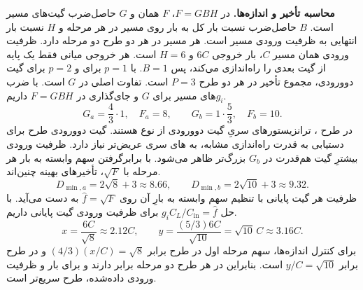 \textbf{محاسبه تأخیر و اندازه‌ها.}
در \(F=GBH\)، \(F\) همان  و \(G\)
حاصل‌ضرب  گیت‌های مسیر است. \(B\)
حاصل‌ضرب نسبت بار کل به بار روی مسیر در هر مرحله و
\(H\) نسبت بار انتهایی به ظرفیت ورودی مسیر است.
هر مسیر در هر دو طرح دو مرحله دارد. ظرفیت ورودی همان مسیر
\(C\)، بار خروجی \(6C\) و \(H=6\) است. هر خروجی میانی
فقط یک پایه از گیت بعدی را راه‌اندازی می‌کند، پس \(B=1\).
با \(p=1\) برای  و \(p=2\) برای گیت دوورودی، مجموع تأخیر
 در هر دو طرح \(P=3\) است. تفاوت اصلی در
\(G\) است.
با ضرب \(g_i\)های مسیر برای \(G\) و جای‌گذاری در \(F=GBH\) داریم.\[
  G_a=\frac43\cdot1,\quad F_a=8,
  \qquad
  G_b=1\cdot\frac53,\quad F_b=10.
\]
در طرح ، ترانزیستورهای سریِ گیت دوورودی از نوع
 هستند. گیت دوورودی طرح  برای دستیابی
به قدرت راه‌اندازی مشابه، به های سری عریض‌تر
نیاز دارد. ظرفیت ورودی بیشترِ گیت هم‌قدرت در \(G_b\) بزرگ‌تر
ظاهر می‌شود.
با برابرگرفتن سهم وابسته به بار هر مرحله با \(\sqrt F\)، تأخیرهای
بهینه چنین‌اند.
\[
  D_{\min,a}=2\sqrt{8}+3\approx8.66,
  \qquad
  D_{\min,b}=2\sqrt{10}+3\approx9.32.
\]
ظرفیت هر گیت پایانی با تنظیم سهم وابسته به بارِ آن روی
\(\widehat f=\sqrt F\) به دست می‌آید.
با حل \(g_i C_L/C_{\mathrm{in}}=\widehat f\) برای ظرفیت
ورودی گیت پایانی داریم.\[
  x=\frac{6C}{\sqrt8}\approx2.12C,
  \qquad
  y=\frac{(5/3)6C}{\sqrt{10}}=\sqrt{10}\,C\approx3.16C.
\]
برای کنترل اندازه‌ها، سهم مرحله اول در طرح 
برابر \((4/3)(x/C)=\sqrt8\) و در طرح  برابر
\(y/C=\sqrt{10}\) است. بنابراین در هر طرح دو مرحله
 برابر دارند و برای بار و ظرفیت ورودی
داده‌شده، طرح  سریع‌تر است.
